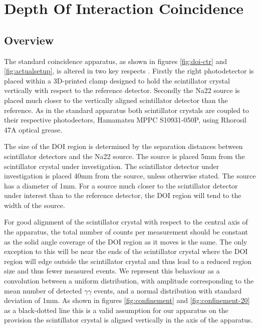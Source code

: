 \section{Depth Of Interaction Coincidence}
\subsection{Overview}
The standard coincidence apparatus, as shown in figures \ref{fig:doi-ctr} and \ref{fig:actualsetup}, is altered in two key respects . Firstly the right photodetector is placed within a 3D-printed clamp designed to hold the scintillator crystal vertically with respect to the reference detector. Secondly the Na22 source is placed much closer to the vertically aligned scintillator detector than the reference. As in the standard apparatus both scintillator crystals are coupled to their respective photodectors, Hamamatsu MPPC S10931-050P, using Rhorosil 47A optical grease. 

The size of the DOI region is determined by the separation distances between scintillator detectors and the Na22 source.  The source is placed 5mm from the scintillator crystal under investigation. The scintillator detector under investigation is placed 40mm from the source, unless otherwise stated. The source has a diameter of 1mm. For a source much closer to the scintillator detector under interest than to the reference detector, the DOI region will tend to the width of the source. 

For good alignment of the scintillator crystal with respect to the central axis of the apparatus, the total number of counts per measurement should be constant as the solid angle coverage of the DOI region as it moves is the same. The only exception to this will be near the ends of the scintillator crystal where the DOI region will edge outside the scintillator crystal and thus lead to a reduced region size and thus fewer measured events.  We represent this behaviour as a convolution between a uniform distribution, with amplitude corresponding to the mean number of detected $\gamma\gamma$ events, and a normal distribution with standard deviation of 1mm. As shown in figures \ref{fig:confinement} and \ref{fig:confinement-20} as a black-dotted line this is a valid assumption for our apparatus on the provision the scintillator crystal is aligned vertically in the axis of the apparatus.

